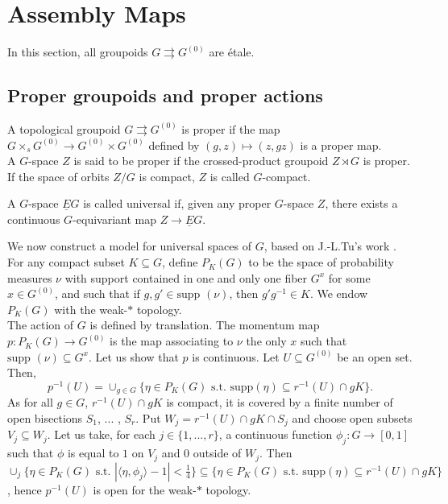 \section{Assembly Maps}

In this section, all groupoids $G\rightrightarrows G^{(0)}$ are étale. 

\subsection{Proper groupoids and proper actions}

\begin{definition}
A topological groupoid $G\rightrightarrows G^{(0)}$ is proper if the map $G\times_s G^{(0)}\rightarrow G^{(0)}\times G^{(0)}$ defined by $(g,z)\mapsto (z,gz)$ is a proper map.\\
A $G$-space $Z$ is said to be proper if the crossed-product groupoid $Z\rtimes G$ is proper. If the space of orbits $Z/G$ is compact, $Z$ is called $G$-compact.
\end{definition}

\begin{definition}
A $G$-space $\underline E G$ is called universal if, given any proper $G$-space $Z$, there exists a continuous $G$-equivariant map $Z\rightarrow \underline E G$.
\end{definition}

We now construct a model for universal spaces of $G$, based on J.-L.Tu's work \cite{TuBC2}. For any compact subset $K\subseteq G$, define $P_K(G)$ to be the space of probability measures $\nu $ with support contained in one and only one fiber $G^x$ for some $x\in G^{(0)}$, and such that if $g,g'\in \text{supp }(\nu)$, then $g'g^{-1}\in K$. We endow $P_K(G)$ with the weak-$*$ topology.\\

The action of $G$ is defined by translation. The momentum map $p : P_K(G)\rightarrow G^{(0)}$ is the map associating to $\nu$ the only $x$ such that $\text{supp }(\nu) \subseteq G^x$. Let us show that $p$ is continuous. Let $U\subseteq G^{(0)}$ be an open set. Then, 
\[p^{-1}(U) = \cup_{g\in G}\{\eta\in P_K(G) \text{ s.t. supp}( \eta ) \subseteq r^{-1}(U) \cap gK\}.\]
As for all $g\in G$, $r^{-1}(U)\cap gK$ is compact, it is covered by a finite number of open bisections $S_1$, ... , $S_r$. Put $W_j= r^{-1}(U)\cap gK\cap S_j$ and choose open subsets $V_j\subseteq W_j$. Let us take, for each $j\in\{1,...,r\}$, a continuous function $\phi_j : G\rightarrow [0,1]$ such that $\phi$ is equal to $1$ on $V_j$ and $0$ outside of $W_j$. Then $\cup_j \{\eta\in P_K(G)\text{ s.t. } |\langle \eta, \phi_j\rangle -1|<\frac{1}{4} \}\subseteq \{\eta\in P_K(G) \text{ s.t. supp}( \eta ) \subseteq r^{-1}(U) \cap gK\}$, hence $p^{-1}(U)$ is open for the weak-$*$ topology.\\


